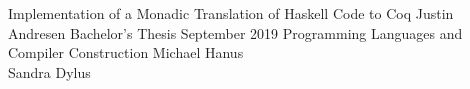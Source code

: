 \documentclass[10pt]{book}
\begin{document}
\frontmatter

\studtitlepage%
  {Implementation of a Monadic Translation of Haskell Code to Coq}
  {}%
  {Justin Andresen}%
  {Bachelor's Thesis}%
  {September 2019}%
  {Programming Languages and Compiler Construction}%
  {Michael Hanus \\ Sandra Dylus}
\cleardoublepage
\eidesstatt

%
\tableofcontents

\setlength{\parindent}{0em}
\setlength{\parskip}{1em}

\mainmatter







\appendix



\backmatter
\tocbibliography
\end{document}
